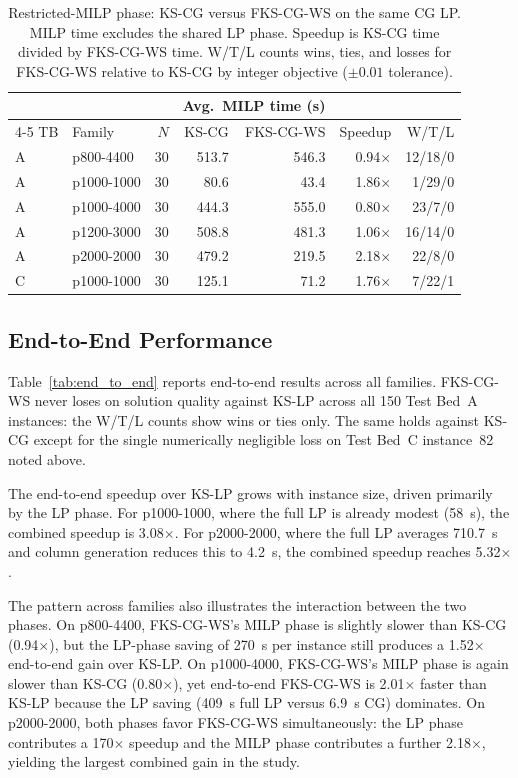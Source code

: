 \begin{table}[htbp]
\centering
\caption{Restricted-MILP phase: KS-CG versus FKS-CG-WS on the same CG LP.
         MILP time excludes the shared LP phase.
         Speedup is KS-CG time divided by FKS-CG-WS time.
         W/T/L counts wins, ties, and losses for FKS-CG-WS relative to KS-CG
         by integer objective ($\pm 0.01$ tolerance).}
\label{tab:kscg_fkscg}
\footnotesize
\setlength{\tabcolsep}{3.5pt}
\begin{tabular}{llrrrrr}
\toprule
 & & & \multicolumn{2}{c}{Avg.\ MILP time (s)} & & \\
\cmidrule(lr){4-5}
TB & Family & $N$ & KS-CG & FKS-CG-WS & Speedup & W/T/L \\
\midrule
A & p800-4400  & 30 & 513.7 & 546.3 & 0.94$\times$ & 12/18/0 \\
A & p1000-1000 & 30 &  80.6 &  43.4 & 1.86$\times$ &  1/29/0 \\
A & p1000-4000 & 30 & 444.3 & 555.0 & 0.80$\times$ & 23/7/0  \\
A & p1200-3000 & 30 & 508.8 & 481.3 & 1.06$\times$ & 16/14/0 \\
A & p2000-2000 & 30 & 479.2 & 219.5 & 2.18$\times$ & 22/8/0  \\
\midrule
C & p1000-1000 & 30 & 125.1 &  71.2 & 1.76$\times$ &  7/22/1 \\
\bottomrule
\end{tabular}
\end{table}

\subsection{End-to-End Performance}
\label{sec:study_end_to_end}

Table~\ref{tab:end_to_end} reports end-to-end results across all families.
FKS-CG-WS never loses on solution quality against KS-LP across all 150 Test Bed~A
instances: the W/T/L counts show wins or ties only.
The same holds against KS-CG except for the single numerically negligible
loss on Test Bed~C instance~82 noted above.

The end-to-end speedup over KS-LP grows with instance size, driven primarily
by the LP phase.
For p1000-1000, where the full LP is already modest (58~s), the combined speedup
is 3.08$\times$.
For p2000-2000, where the full LP averages 710.7~s and column generation
reduces this to 4.2~s, the combined speedup reaches 5.32$\times$.

The pattern across families also illustrates the interaction between the two
phases.
On p800-4400, FKS-CG-WS's MILP phase is slightly slower than KS-CG (0.94$\times$),
but the LP-phase saving of 270~s per instance still produces a 1.52$\times$
end-to-end gain over KS-LP.
On p1000-4000, FKS-CG-WS's MILP phase is again slower than KS-CG (0.80$\times$),
yet end-to-end FKS-CG-WS is 2.01$\times$ faster than KS-LP because the LP saving
(409~s full LP versus 6.9~s CG) dominates.
On p2000-2000, both phases favor FKS-CG-WS simultaneously: the LP phase contributes
a 170$\times$ speedup and the MILP phase contributes a further 2.18$\times$,
yielding the largest combined gain in the study.

